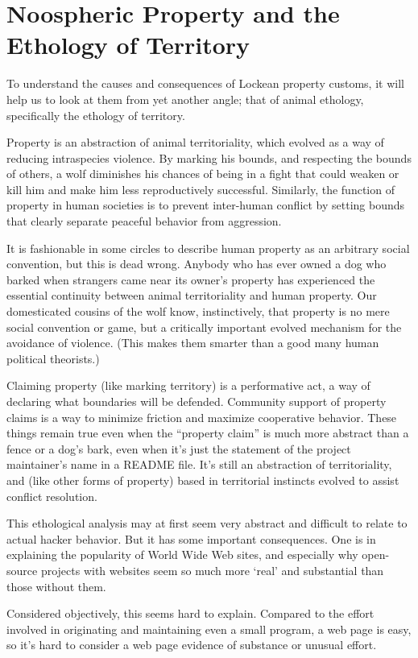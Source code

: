 \section{Noospheric Property and the Ethology of Territory}

To understand the causes and consequences of Lockean property customs, it will
help us to look at them from yet another angle; that of animal ethology,
specifically the ethology of territory.

Property is an abstraction of animal territoriality, which evolved as a way of
reducing intraspecies violence.  By marking his bounds, and respecting the
bounds of others, a wolf diminishes his chances of being in a fight that could
weaken or kill him and make him less reproductively successful.  Similarly, the
function of property in human societies is to prevent inter-human conflict by
setting bounds that clearly separate peaceful behavior from aggression.

It is fashionable in some circles to describe human property as an arbitrary
social convention, but this is dead wrong.  Anybody who has ever owned a dog who
barked when strangers came near its owner's property has experienced the
essential continuity between animal territoriality and human property.  Our
domesticated cousins of the wolf know, instinctively, that property is no mere
social convention or game, but a critically important evolved mechanism for the
avoidance of violence.  (This makes them smarter than a good many human
political theorists.)

Claiming property (like marking territory) is a performative act, a way of
declaring what boundaries will be defended.  Community support of property
claims is a way to minimize friction and maximize cooperative behavior.  These
things remain true even when the ``property claim'' is much more abstract than a
fence or a dog's bark, even when it's just the statement of the project
maintainer's name in a README file.  It's still an abstraction of
territoriality, and (like other forms of property) based in territorial
instincts evolved to assist conflict resolution.

This ethological analysis may at first seem very abstract and difficult to
relate to actual hacker behavior.  But it has some important consequences.  One
is in explaining the popularity of World Wide Web sites, and especially why
open-source projects with websites seem so much more `real' and substantial than
those without them.

Considered objectively, this seems hard to explain.  Compared to the effort
involved in originating and maintaining even a small program, a web page is
easy, so it's hard to consider a web page evidence of substance or unusual
effort.

